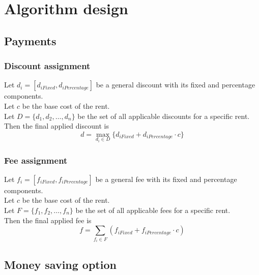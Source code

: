 \section{Algorithm design}
\subsection{Payments}\label{sec:paymentAlgorithms}
\subsubsection{Discount assignment}
Let $d_i=[d_{iFixed},d_{iPercentage}]$ be a general discount with its fixed and percentage components.\\
Let $c$ be the base cost of the rent.\\
Let $D = \lbrace d_1,d_2,\ldots,d_n\rbrace$ be the set of all applicable discounts for a specific rent.\\
Then the final applied discount is $$d = \max_{d_i\in D} \lbrace d_{iFixed}+d_{iPercentage}\cdot c \rbrace$$

\subsubsection{Fee assignment}
Let $f_i=[f_{iFixed},f_{iPercentage}]$ be a general fee with its fixed and percentage components.\\
Let $c$ be the base cost of the rent.\\
Let $F = \lbrace f_1,f_2,\ldots,f_n\rbrace$ be the set of all applicable fees for a specific rent.\\
Then the final applied fee is $$f = \sum_{f_i\in F} ( f_{iFixed} + f_{iPercentage} \cdot c )$$

\subsection{Money saving option}

